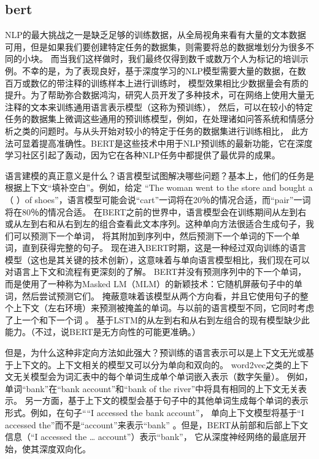 \subsection{bert}
NLP的最大挑战之一是缺乏足够的训练数据，从全局视角来看有大量的文本数据可用，但是如果我们要创建特定任务的数据集，则需要将总的数据堆划分为很多不同的小块。
而当我们这样做时，我们最终仅得到数千或数万个人为标记的培训示例。不幸的是，为了表现良好，基于深度学习的NLP模型需要大量的数据，在数百万或数亿的带注释的训练样本上进行训练时，
模型效果相比少数据量会有质的提升。为了帮助弥合数据鸿沟，研究人员开发了多种技术，可在网络上使用大量无注释的文本来训练通用语言表示模型（这称为预训练），
然后，可以在较小的特定任务的数据集上微调这些通用的预训练模型，例如，在处理诸如问答系统和情感分析之类的问题时。与从头开始对较小的特定于任务的数据集进行训练相比，
此方法可显着提高准确性。BERT是这些技术中用于NLP预训练的最新功能，它在深度学习社区引起了轰动，因为它在各种NLP任务中都提供了最优异的成果。

语言建模的真正意义是什么？语言模型试图解决哪些问题？基本上，他们的任务是根据上下文“填补空白”。例如，给定
“The woman went to the store and bought a（ ）of shoes”，语言模型可能会说“cart”一词将在20％的情况合适，而“pair”一词将在80％的情况合适。
在BERT之前的世界中，语言模型会在训练期间从左到右或从左到右和从右到左的组合查看此文本序列。这种单向方法很适合生成句子，我们可以预测下一个单词，
将其附加到序列中，然后预测下一个单词的下一个单词，直到获得完整的句子。
现在进入BERT时期，这是一种经过双向训练的语言模型（这也是其关键的技术创新），这意味着与单向语言模型相比，我们现在可以对语言上下文和流程有更深刻的了解。
BERT并没有预测序列中的下一个单词，而是使用了一种称为Masked LM（MLM）的新颖技术：它随机屏蔽句子中的单词，然后尝试预测它们。
掩蔽意味着该模型从两个方向看，并且它使用句子的整个上下文（左右环境）来预测被掩盖的单词。与以前的语言模型不同，它同时考虑了上一个和下一个词 。
基于LSTM的从左到右和从右到左组合的现有模型缺少此能力。（不过，说BERT是无方向性的可能更准确。）

但是，为什么这种非定向方法如此强大？预训练的语言表示可以是上下文无光或基于上下文的。上下文相关的模型又可以分为单向和双向的。
word2vec之类的上下文无关模型会为词汇表中的每个单词生成单个单词嵌入表示（数字矢量）。
例如，单词“bank”在“bank account”和“bank of the river”中将具有相同的上下文无关表示。
另一方面，基于上下文的模型会基于句子中的其他单词生成每个单词的表示形式。例如，在句子““I accessed the bank account”，
单向上下文模型将基于“I accessed the”而不是“account”来表示“bank” 。但是，BERT从前部和后部上下文信息（“I accessed the … account”）表示“bank”，
它从深度神经网络的最底层开始，使其深度双向化。

